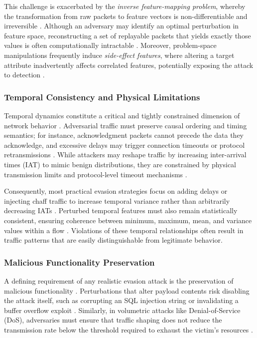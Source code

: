 This challenge is exacerbated by the \emph{inverse feature-mapping problem}, whereby the transformation from raw packets to feature vectors is non-differentiable and irreversible \cite{han2021evaluating}. 
Although an adversary may identify an optimal perturbation in feature space, reconstructing a set of replayable packets that yields exactly those values is often computationally intractable \cite{debicha2023adv}. 
Moreover, problem-space manipulations frequently induce \emph{side-effect features}, where altering a target attribute inadvertently affects correlated features, potentially exposing the attack to detection \cite{vitorino2023sok}.

\subsubsection{Temporal Consistency and Physical Limitations}

Temporal dynamics constitute a critical and tightly constrained dimension of network behavior \cite{hartl2020explainability}. 
Adversarial traffic must preserve causal ordering and timing semantics; for instance, acknowledgment packets cannot precede the data they acknowledge, and excessive delays may trigger connection timeouts or protocol retransmissions \cite{ennaji2025adversarial}. 
While attackers may reshape traffic by increasing inter-arrival times (IAT) to mimic benign distributions, they are constrained by physical transmission limits and protocol-level timeout mechanisms \cite{liu2025hard}.

Consequently, most practical evasion strategies focus on adding delays or injecting chaff traffic to increase temporal variance rather than arbitrarily decreasing IATs \cite{han2021evaluating}. 
Perturbed temporal features must also remain statistically consistent, ensuring coherence between minimum, maximum, mean, and variance values within a flow \cite{zhang2022adversarial}. 
Violations of these temporal relationships often result in traffic patterns that are easily distinguishable from legitimate behavior.

\subsubsection{Malicious Functionality Preservation}

A defining requirement of any realistic evasion attack is the preservation of malicious functionality \cite{jiang2022fgmd}. 
Perturbations that alter payload contents risk disabling the attack itself, such as corrupting an SQL injection string or invalidating a buffer overflow exploit \cite{wang2024progen}. 
Similarly, in volumetric attacks like Denial-of-Service (DoS), adversaries must ensure that traffic shaping does not reduce the transmission rate below the threshold required to exhaust the victim’s resources \cite{han2021evaluating}.

